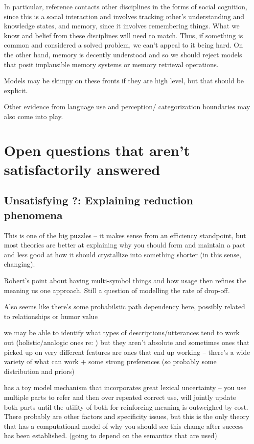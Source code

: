\documentclass[]{article}
\begin{document}
In particular, reference contacts other disciplines in the forms of social cognition, since this is a social interaction and involves tracking other's understanding and knowledge states, and memory, since it involves remembering things. What we know and belief from these disciplines will need to match. Thus, if something is common and considered a solved problem, we can't appeal to it being hard. On the other hand, memory is decently understood and so we should reject models that posit implausible memory systems or memory retrieval operations. 

Models may be skimpy on these fronts if they are high level, but that should be explicit. 

Other evidence from language use and perception/ categorization boundaries may also come into play. 

\section{Open questions that aren't satisfactorily answered}
\subsection{Unsatisfying ?: Explaining reduction phenomena}
This is one of the big puzzles -- it makes sense from an efficiency standpoint, but most theories are better at explaining why you should form and maintain a pact and less good at how it should crystallize into something shorter (in this sense, changing). 

Robert's point about having multi-symbol things and how usage then refines the meaning us one approach. Still a question of modelling the rate of drop-off. 

Also seems like there's some probabilstic path dependency here, possibly related to relationships or humor value

we may be able to identify what types of descriptions/utterances tend to work out (holistic/analogic ones re: \cite{clark1986}) but they aren't absolute and sometimes ones that picked up on very different features are ones that end up working -- there's a wide variety of what can work + some strong preferences (so probably some distribution and priors) 

\cite{hawkins2021} has a toy model mechanism that incorporates great lexical uncertainty -- you use multiple parts to refer and then over repeated correct use, will jointly update both parts until the utility of both for reinforcing meaning is outweighed by cost. There probably are other factors and specificity issues, but this is the only theory that has a computational model of why you should see this change after success has been established. (going to depend on the semantics that are used) 
\end{document}
